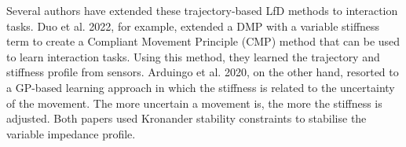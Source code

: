 











Several authors have extended these trajectory-based LfD methods to interaction tasks. Duo et al. 2022, for example, \cite{douRobotSkillLearning2022} extended a DMP with a variable stiffness term to create a Compliant Movement Principle (CMP) method that can be used to learn interaction tasks. Using this method, they learned the trajectory and stiffness profile from sensors. Arduingo et al. 2020, on the other hand, resorted to a GP-based learning approach in which the stiffness is related to the uncertainty of the movement. The more uncertain a movement is, the more the stiffness is adjusted. Both papers used Kronander stability constraints to stabilise the variable impedance profile.

